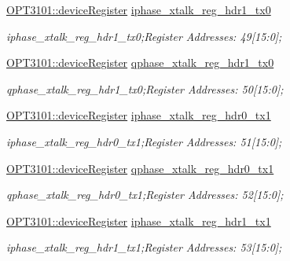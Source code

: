 \begin{DoxyCompactItemize}
\mbox{\hyperlink{class_o_p_t3101_1_1device_register}{O\+P\+T3101\+::device\+Register}} \mbox{\hyperlink{class_o_p_t3101_1_1registers_a7fab5a5b19baca26a16000bf2df02002}{iphase\+\_\+xtalk\+\_\+reg\+\_\+hdr1\+\_\+tx0}}
\begin{DoxyCompactList}\small\item\em iphase\+\_\+xtalk\+\_\+reg\+\_\+hdr1\+\_\+tx0;Register Addresses\+: 49\mbox{[}15\+:0\mbox{]}; \end{DoxyCompactList}\item 
\mbox{\hyperlink{class_o_p_t3101_1_1device_register}{O\+P\+T3101\+::device\+Register}} \mbox{\hyperlink{class_o_p_t3101_1_1registers_afa43b99529475a32879117d1a05285ca}{qphase\+\_\+xtalk\+\_\+reg\+\_\+hdr1\+\_\+tx0}}
\begin{DoxyCompactList}\small\item\em qphase\+\_\+xtalk\+\_\+reg\+\_\+hdr1\+\_\+tx0;Register Addresses\+: 50\mbox{[}15\+:0\mbox{]}; \end{DoxyCompactList}\item 
\mbox{\hyperlink{class_o_p_t3101_1_1device_register}{O\+P\+T3101\+::device\+Register}} \mbox{\hyperlink{class_o_p_t3101_1_1registers_a897d8a5ef0a4d37b24e20276eb51a952}{iphase\+\_\+xtalk\+\_\+reg\+\_\+hdr0\+\_\+tx1}}
\begin{DoxyCompactList}\small\item\em iphase\+\_\+xtalk\+\_\+reg\+\_\+hdr0\+\_\+tx1;Register Addresses\+: 51\mbox{[}15\+:0\mbox{]}; \end{DoxyCompactList}\item 
\mbox{\hyperlink{class_o_p_t3101_1_1device_register}{O\+P\+T3101\+::device\+Register}} \mbox{\hyperlink{class_o_p_t3101_1_1registers_a52319d30260b679a9d5f7cdbba2a02c8}{qphase\+\_\+xtalk\+\_\+reg\+\_\+hdr0\+\_\+tx1}}
\begin{DoxyCompactList}\small\item\em qphase\+\_\+xtalk\+\_\+reg\+\_\+hdr0\+\_\+tx1;Register Addresses\+: 52\mbox{[}15\+:0\mbox{]}; \end{DoxyCompactList}\item 
\mbox{\hyperlink{class_o_p_t3101_1_1device_register}{O\+P\+T3101\+::device\+Register}} \mbox{\hyperlink{class_o_p_t3101_1_1registers_af9c224172ff25332ec86b202ce405407}{iphase\+\_\+xtalk\+\_\+reg\+\_\+hdr1\+\_\+tx1}}
\begin{DoxyCompactList}\small\item\em iphase\+\_\+xtalk\+\_\+reg\+\_\+hdr1\+\_\+tx1;Register Addresses\+: 53\mbox{[}15\+:0\mbox{]}; \end{DoxyCompactList}\item 

\end{DoxyCompactItemize}

